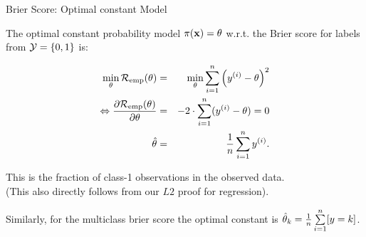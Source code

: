 \documentclass[11pt,compress,t,notes=noshow, xcolor=table]{beamer}
\begin{document}
\begin{vbframe}{Brier Score: Optimal constant Model}

The optimal constant probability model $\pi(\mathbf{x}) = \theta$ w.r.t. the Brier score for labels from $\mathcal{Y} = \{0, 1\}$ is:

\vspace*{-0.2cm}

\begin{eqnarray*}
  \min_{\theta} \mathcal{R}_{\text{emp}}(\theta) &=& \min_{\theta} \sum\limits_{i=1}^n \left(y^{(i)} - \theta\right)^2 \\
  \Leftrightarrow \frac{\partial \mathcal{R}_{\text{emp}}(\theta)}{\partial \theta} &=& - 2 \cdot \sum\limits_{i=1}^n (y^{(i)} - \theta) = 0 \\
  \hat \theta &=& \frac{1}{n} \sum\limits_{i=1}^n y^{(i)}.   
\end{eqnarray*}

This is the fraction of class-1 observations in the observed data.\\
(This also directly follows from our $L2$ proof for regression).

\vspace*{0.2cm}

Similarly, for the multiclass brier score the optimal constant is $\hat{\theta}_k = \frac{1}{n}\sum\limits_{i=1}^n [y = k]$. 

\end{vbframe}
\end{document}
